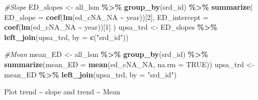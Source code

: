 \documentclass[
]{article}
\newenvironment{Shaded}{\begin{snugshade}}{\end{snugshade}}
\newcommand{\AttributeTok}[1]{\textcolor[rgb]{0.13,0.29,0.53}{#1}}
\newcommand{\CommentTok}[1]{\textcolor[rgb]{0.56,0.35,0.01}{\textit{#1}}}
\newcommand{\ConstantTok}[1]{\textcolor[rgb]{0.56,0.35,0.01}{#1}}
\newcommand{\DecValTok}[1]{\textcolor[rgb]{0.00,0.00,0.81}{#1}}
\newcommand{\FunctionTok}[1]{\textcolor[rgb]{0.13,0.29,0.53}{\textbf{#1}}}
\newcommand{\NormalTok}[1]{#1}
\newcommand{\OtherTok}[1]{\textcolor[rgb]{0.56,0.35,0.01}{#1}}
\newcommand{\SpecialCharTok}[1]{\textcolor[rgb]{0.81,0.36,0.00}{\textbf{#1}}}
\newcommand{\StringTok}[1]{\textcolor[rgb]{0.31,0.60,0.02}{#1}}
\begin{document}
\begin{Shaded}
\begin{Highlighting}[]
\CommentTok{\#Slope}
\NormalTok{ED\_slopes }\OtherTok{\textless{}{-}}\NormalTok{ all\_lsm }\SpecialCharTok{\%\textgreater{}\%}
  \FunctionTok{group\_by}\NormalTok{(srd\_id) }\SpecialCharTok{\%\textgreater{}\%}
  \FunctionTok{summarize}\NormalTok{(}
    \AttributeTok{ED\_slope =} \FunctionTok{coef}\NormalTok{(}\FunctionTok{lm}\NormalTok{(ed\_cNA\_NA }\SpecialCharTok{\textasciitilde{}}\NormalTok{ year))[}\DecValTok{2}\NormalTok{],  }
    \AttributeTok{ED\_intercept =} \FunctionTok{coef}\NormalTok{(}\FunctionTok{lm}\NormalTok{(ed\_cNA\_NA }\SpecialCharTok{\textasciitilde{}}\NormalTok{ year))[}\DecValTok{1}\NormalTok{] }
\NormalTok{  )}
\NormalTok{upsa\_trd }\OtherTok{\textless{}{-}}\NormalTok{ ED\_slopes }\SpecialCharTok{\%\textgreater{}\%}
  \FunctionTok{left\_join}\NormalTok{(upsa\_trd, }\AttributeTok{by =} \FunctionTok{c}\NormalTok{(}\StringTok{"srd\_id"}\NormalTok{))}

\CommentTok{\#Mean}
\NormalTok{mean\_ED }\OtherTok{\textless{}{-}}\NormalTok{ all\_lsm }\SpecialCharTok{\%\textgreater{}\%}
  \FunctionTok{group\_by}\NormalTok{(srd\_id) }\SpecialCharTok{\%\textgreater{}\%}
  \FunctionTok{summarize}\NormalTok{(}\AttributeTok{mean\_ED =} \FunctionTok{mean}\NormalTok{(ed\_cNA\_NA, }\AttributeTok{na.rm =} \ConstantTok{TRUE}\NormalTok{))}
\NormalTok{upsa\_trd }\OtherTok{\textless{}{-}}\NormalTok{ mean\_ED }\SpecialCharTok{\%\textgreater{}\%}
  \FunctionTok{left\_join}\NormalTok{(upsa\_trd, }\AttributeTok{by =} \StringTok{"srd\_id"}\NormalTok{)}
\end{Highlighting}
\end{Shaded}

Plot trend \textasciitilde{} slope and trend \textasciitilde{} Mean
\end{document}
